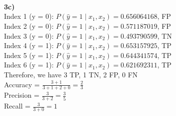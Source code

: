 \documentclass[12pt]{article}
\begin{document}
\paragraph{\\}
\textbf{3c)}\\
Index 1 (y = 0): $ P(\hat{y} = 1\mid x_{1}, x_{2}) = 0.656064168$, FP\\
Index 2 (y = 0): $ P(\hat{y} = 1\mid x_{1}, x_{2}) = 0.571187019$, FP\\
Index 3 (y = 0): $ P(\hat{y} = 1\mid x_{1}, x_{2}) = 0.493790599$, TN\\
Index 4 (y = 1): $ P(\hat{y} = 1\mid x_{1}, x_{2}) = 0.653157925$, TP\\
Index 5 (y = 1): $ P(\hat{y} = 1\mid x_{1}, x_{2}) = 0.644341574$, TP\\
Index 6 (y = 1): $ P(\hat{y} = 1\mid x_{1}, x_{2}) = 0.621692311$, TP\\
Therefore, we have 3 TP, 1 TN, 2 FP, 0 FN\\[0.2in]
Accuracy = $\frac{3+1}{3+1+2+0} = \frac{2}{3}$\\
Precision = $\frac{3}{3+2} = \frac{3}{5}$\\
Recall = $\frac{3}{3+0} = 1$\\
\end{document}
